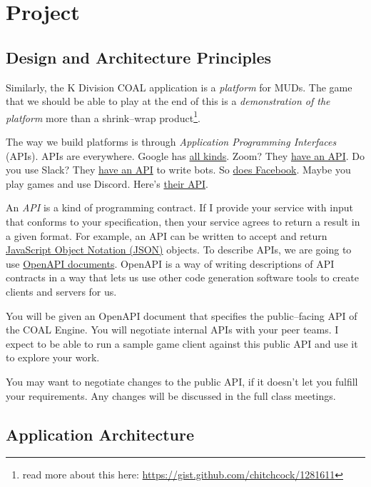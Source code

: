 \documentclass{article}
\newcommand{\enterProblemHeader}[1]{
}
\newcommand{\exitProblemHeader}[1]{
\nobreak\extramarks{#1}{}\nobreak
}
\newcounter{homeworkProblemCounter} %
\newcommand{\homeworkProblemName}{}
\newenvironment{homeworkProblem}[1][Problem \arabic{homeworkProblemCounter}]{ %
\stepcounter{homeworkProblemCounter} %
\renewcommand{\homeworkProblemName}{#1} %
\section{\homeworkProblemName} %
\enterProblemHeader{\homeworkProblemName} %
}{
\exitProblemHeader{\homeworkProblemName} %
}
\newcommand{\homeworkSectionName}{}
\newenvironment{homeworkSection}[1]{ %
\renewcommand{\homeworkSectionName}{#1} %
\subsection{\homeworkSectionName} %
\enterProblemHeader{\homeworkProblemName\ [\homeworkSectionName]} %
}{
\enterProblemHeader{\homeworkProblemName} %
}
\begin{document}
\begin{homeworkProblem}[Project]
\begin{homeworkSection}{Design and Architecture Principles}
  Similarly, the K Division COAL application is a \textit{platform} for MUDs. The game that we should be able to play at the end of this is a \textit{demonstration of the platform} more than a shrink--wrap product\footnote{read more about this here: \url{https://gist.github.com/chitchcock/1281611}}.
  
  The way we build platforms is through \textit{Application Programming Interfaces} (APIs). APIs are everywhere. Google has \href{https://developers.google.com/apis-explorer}{all kinds}. Zoom? They \href{https://marketplace.zoom.us/docs/api-reference/zoom-api}{have an API}. Do you use Slack? They \href{https://api.slack.com/}{have an API} to write bots. So \href{https://developers.facebook.com/}{does Facebook}. Maybe you play games and use Discord. Here's \href{https://discord.com/developers/docs/intro}{their API}.
  
	An \textit{API} is a kind of programming contract. If I provide your service with input that conforms to your specification, then your service agrees to return a result in a given format. For example, an API can be written to accept and return \href{https://en.wikipedia.org/wiki/JSON}{JavaScript Object Notation (JSON)} objects. To describe APIs, we are going to use \href{https://swagger.io/specification/}{OpenAPI documents}. OpenAPI is a way of writing descriptions of API contracts in a way that lets us use other code generation software tools to create clients and servers for us.

  You will be given an OpenAPI document that specifies the public--facing API of the COAL Engine. You will negotiate internal APIs with your peer teams. I expect to be able to run a sample game client against this public API and use it to explore your work.
	
	You may want to negotiate changes to the public API, if it doesn't let you fulfill your requirements. Any changes will be discussed in the full class meetings.
\end{homeworkSection}

\begin{homeworkSection}{Application Architecture}
	
\begin{figure}
\centering
{}
\end{figure}
\end{homeworkSection}
\end{homeworkProblem}
\end{document}

